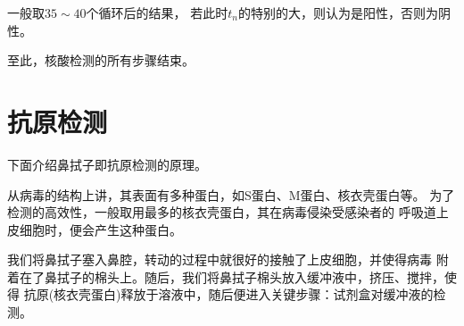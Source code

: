 \documentclass[UTF8,a4paper,11 pt]{ctexart}%
\begin{document}
	一般取$35\sim 40$个循环后的结果，
	若此时$t_n$的特别的大，则认为是阳性，否则为阴性。
	
	至此，核酸检测的所有步骤结束。
	\part{抗原检测}
	
	下面介绍鼻拭子即抗原检测的原理。
	
	从病毒的结构上讲，其表面有多种蛋白，如S蛋白、M蛋白、核衣壳蛋白等。
	为了检测的高效性，一般取用最多的核衣壳蛋白，其在病毒侵染受感染者的
	呼吸道上皮细胞时，便会产生这种蛋白。
	
	我们将鼻拭子塞入鼻腔，转动的过程中就很好的接触了上皮细胞，并使得病毒
	附着在了鼻拭子的棉头上。随后，我们将鼻拭子棉头放入缓冲液中，挤压、搅拌，使得
	抗原(核衣壳蛋白)释放于溶液中，随后便进入关键步骤：试剂盒对缓冲液的检测。
	
\end{document}
